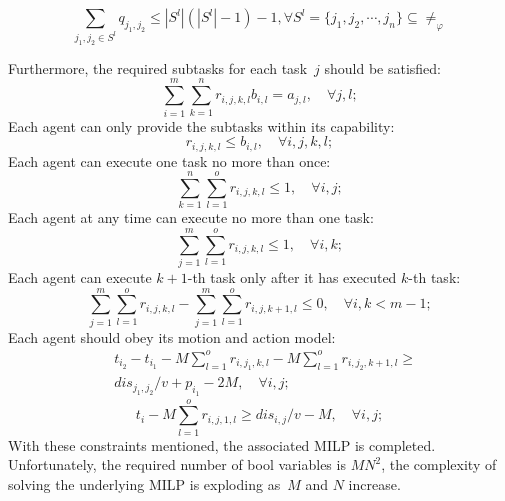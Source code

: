 \begin{equation}
\sum_{j_1,j_2\in S^l}q_{j_1,j_2} \leq |S^l|(|S^l|-1)-1, \forall S^l=\{j_1,j_2,\cdots,j_n\}\subseteq \neq_{\varphi}
\label{1.8}
\end{equation}

Furthermore, the required subtasks for each task~$j$ should be satisfied:
\begin{equation}
\sum_{i=1}^{m}\sum_{k=1}^{n}r_{i,j,k,l}b_{i,l}= a_{j,l},   \quad \forall j,l;
\label{2}
\end{equation}
Each agent can only provide the subtasks within its capability:
\begin{equation}
r_{i,j,k,l}\leq b_{i,l},   \quad \forall i,j,k,l;
\label{3}
\end{equation}
Each agent can execute one task no more than once:
\begin{equation}
\sum_{k=1}^{n}\sum_{l=1}^{o}r_{i,j,k,l} \leq 1,\quad   \forall i,j;
\label{4}
\end{equation}
Each agent at any time can execute no more than one task:
\begin{equation}
\sum_{j=1}^{m}\sum_{l=1}^{o}r_{i,j,k,l} \leq 1,\quad    \forall i,k;
\label{5}
\end{equation}
Each agent can execute $k+1$-th task only after it has executed $k$-th task:
\begin{equation}
  \sum_{j=1}^{m}\sum_{l=1}^{o}r_{i,j,k,l} - \sum_{j=1}^{m}\sum_{l=1}^{o}r_{i,j,k+1,l}
  \leq  0,    \quad\forall i,k<m-1;
\label{6}
\end{equation}
Each agent should obey its motion and action model:
\begin{equation}
\begin{aligned}
&t_{i_2}-t_{i_1} -M\sum_{l=1}^o r_{i,j_1,k,l}-M\sum_{l=1}^o r_{i,j_2,k+1,l}  \geq\\
& dis_{j_1,j_2}/v+p_{i_1}-2M, \quad   \forall i,j;
\end{aligned}
\label{7}
\end{equation}
\begin{equation}
t_{i} -M\sum_{l=1}^o r_{i,j,1,l} \geq dis_{i,j}/v-M, \quad  \forall i,j;
\label{8}
\end{equation}
With these constraints mentioned, the associated MILP is completed.
Unfortunately, the required number of bool variables
is $MN^2$, the complexity of solving the underlying MILP
is exploding as~$M$ and $N$ increase.



